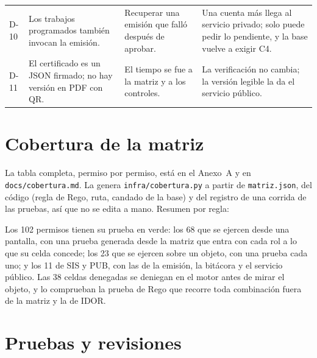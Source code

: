 \documentclass[11pt,letterpaper]{article}
\newcommand{\cod}[1]{\texttt{\small #1}}
\newcommand{\arch}[1]{\texttt{\small #1}}
\begin{document}
\begin{center}
\begin{longtable}{@{}L{0.8cm} L{4.2cm} L{4.6cm} p{5.0cm}@{}}
D-10 & Los trabajos programados también invocan la emisión. & Recuperar una emisión que falló después de aprobar. & Una cuenta más llega al servicio privado; solo puede pedir lo pendiente, y la base vuelve a exigir C4. \\
D-11 & El certificado es un JSON firmado; no hay versión en PDF con QR. & El tiempo se fue a la matriz y a los controles. & La verificación no cambia; la versión legible la da el servicio público. \\
\bottomrule
\end{longtable}
\end{center}

\section{Cobertura de la matriz}

La tabla completa, permiso por permiso, está en el Anexo~A y en \cod{docs/cobertura.md}. La genera
\arch{infra/cobertura.py} a partir de \cod{matriz.json}, del código (regla de Rego, ruta, candado de
la base) y del registro de una corrida de las pruebas, así que no se edita a mano. Resumen por regla:



Los 102 permisos tienen su prueba en verde: los 68 que se ejercen desde una pantalla, con una prueba
generada desde la matriz que entra con cada rol a lo que su celda concede; los 23 que se ejercen sobre
un objeto, con una prueba cada uno; y los 11 de SIS y PUB, con las de la emisión, la bitácora y el
servicio público. Las 38 celdas denegadas se deniegan en el motor antes de mirar el objeto, y lo
comprueban la prueba de Rego que recorre toda combinación fuera de la matriz y la de IDOR.

\section{Pruebas y revisiones}\label{sec:pruebas}
\end{document}
